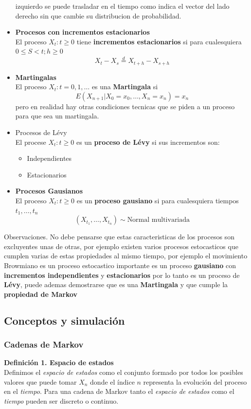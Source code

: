 \documentclass[10pt,a4paper]{article}
\theoremstyle{definition}
\theoremstyle{remark}
\begin{document}
\begin{multicols}{2}
\begin{itemize}
	izquierdo se puede trasladar en el tiempo como indica el vector del lado derecho sin 
	que cambie su distribucion de probabilidad.\\
	\item \textbf{Procesos con incrementos estacionarios}\\
	El proceso ${X_t : t \geq 0}$ tiene \textbf{incrementos estacionarios} si para 
	cualesquiera $0\leq S < t; h \geq 0 $ $$X_t - X_s \stackrel{d}{=} X_{t+h} - X_{s+h} 
	$$
	\item \textbf{Martingalas} \\
	El proceso ${X_t : t = 0,1,\dots}$ es una \textbf{Martingala} si $$E(X_{n+1}|
	X_0=x_0,\dots,X_n=x_n)=x_n$$ pero en realidad hay otras condiciones tecnicas que se 
	piden a un proceso para que sea un martingala.\\
	\item Procesos de Lévy \\
	El procese ${X_t: t\geq0}$ es un \textbf{proceso de Lévy} si sus incrementos son:
	\begin{itemize}
		\item Independientes
		\item Estacionarios
	\end{itemize}
	\item \textbf{Procesos Gausianos}\\
	El proceso $X_t: t\geq 0$ es un \textbf{proceso gausiano} si para cualesquiera 
	tiempos $t_1,\dots,t_n$ 
	$$(X_{t_1},\dots,X_{t_n}) \sim \mbox{Normal multivariada}$$
\end{itemize}
Observaciones. No debe pensarse que estas caracteristicas de los procesos son 
excluyentes unas de otras, por ejemplo existen varios procesos estocasticos que cumplen 
varias de estas propiedades al mismo tiempo, por ejemplo el movimiento Browmiano es un 
proceso estocastico importante es un proceso \textbf{gausiano} con \textbf{incrementos 
independientes} y \textbf{estacionarios} por lo tanto es un proceso de \textbf{Lévy}, 
puede ademas demostrarse que es una \textbf{Martingala} y  que cumple la 
\textbf{propiedad de Markov}

\subsection{Conceptos y simulación}
\subsubsection{Cadenas de Markov}
\textbf{Definición 1. Espacio de estados}\\
Definimos el \textit{espacio de estados} como el conjunto formado por todos los posibles 
valores que puede tomar $X_{n}$ donde el índice $n$ representa la evolución del proceso 
en el \textit{tiempo}. Para una cadena de Markov tanto el \textit{espacio de estados} 
como el \textit{tiempo} pueden ser discreto o continuo.\\


\end{multicols}
\end{document}

